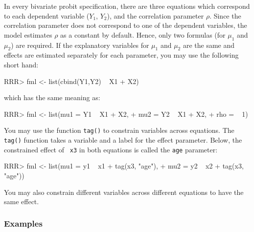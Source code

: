 In every bivariate probit specification, there are three equations
which correspond to each dependent variable ($Y_1$, $Y_2$), and the
correlation parameter $\rho$.  Since the correlation parameter does
not correspond to one of the dependent variables, the model estimates
$\rho$ as a constant by default.  Hence, only two formulas (for
$\mu_1$ and $\mu_2$) are required.  If the explanatory variables for
$\mu_1$ and $\mu_2$ are the same and effects are estimated separately
for each parameter, you may use the following short hand:  
\begin{Schunk}
\begin{Sinput}
RRR> fml <- list(cbind(Y1,Y2) ~ X1 + X2)
\end{Sinput}
\end{Schunk}
which has the same meaning as:  
\begin{Schunk}
\begin{Sinput}
RRR> fml <- list(mu1 = Y1 ~ X1 + X2,  
+             mu2 = Y2 ~ X1 + X2, 
+             rho = ~ 1)
\end{Sinput}
\end{Schunk}
You may use the function {\tt tag()} to constrain variables across
equations.  The {\tt tag()} function takes a variable and a label for
the effect parameter.  Below, the constrained effect of {\tt
x3} in both equations is called the {\tt age} parameter:  
\begin{Schunk}
\begin{Sinput}
RRR> fml <- list(mu1 = y1 ~ x1 + tag(x3, "age"), 
+             mu2 = y2 ~ x2 + tag(x3, "age"))
\end{Sinput}
\end{Schunk}
You may also constrain different variables across different equations
to have the same effect.  

\subsubsection{Examples}

